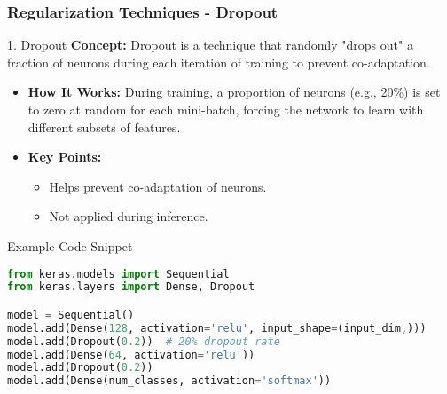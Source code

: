 \documentclass[aspectratio=169]{beamer}
\begin{document}
\begin{frame}[fragile]
    \frametitle{Regularization Techniques - Dropout}
    \begin{block}{1. Dropout}
        \textbf{Concept:} Dropout is a technique that randomly "drops out" a fraction of neurons during each iteration of training to prevent co-adaptation.
    \end{block}
    
    \begin{itemize}
        \item \textbf{How It Works:} During training, a proportion of neurons (e.g., 20\%) is set to zero at random for each mini-batch, forcing the network to learn with different subsets of features.
        \item \textbf{Key Points:}
        \begin{itemize}
            \item Helps prevent co-adaptation of neurons.
            \item Not applied during inference.
        \end{itemize}
    \end{itemize}
    
    \begin{block}{Example Code Snippet}
        \begin{lstlisting}[language=Python]
from keras.models import Sequential
from keras.layers import Dense, Dropout

model = Sequential()
model.add(Dense(128, activation='relu', input_shape=(input_dim,)))
model.add(Dropout(0.2))  # 20% dropout rate
model.add(Dense(64, activation='relu'))
model.add(Dropout(0.2))
model.add(Dense(num_classes, activation='softmax'))
        \end{lstlisting}
    \end{block}
\end{frame}
\end{document}
